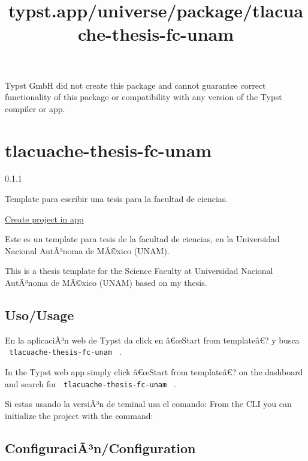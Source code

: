 Typst GmbH did not create this package and cannot guarantee correct
functionality of this package or compatibility with any version of the
Typst compiler or app.


\title{typst.app/universe/package/tlacuache-thesis-fc-unam}

\label{banner}
\label{template-thumbnail}

\section{tlacuache-thesis-fc-unam}\label{tlacuache-thesis-fc-unam}

{ 0.1.1 }

Template para escribir una tesis para la facultad de ciencias.

\href{/app?template=tlacuache-thesis-fc-unam&version=0.1.1}{Create
project in app}

\label{readme}
Este es un template para tesis de la facultad de ciencias, en la
Universidad Nacional AutÃ³noma de MÃ©xico (UNAM).

This is a thesis template for the Science Faculty at Universidad
Nacional AutÃ³noma de MÃ©xico (UNAM) based on my thesis.

\subsection{Uso/Usage}\label{usousage}

En la aplicaciÃ³n web de Typst da click en â€œStart from templateâ€? y
busca \texttt{\ tlacuache-thesis-fc-unam\ } .

In the Typst web app simply click â€œStart from templateâ€? on the
dashboard and search for \texttt{\ tlacuache-thesis-fc-unam\ } .

Si estas usando la versiÃ³n de teminal usa el comando: From the CLI you
can initialize the project with the command:

\begin{Shaded}
\begin{Highlighting}[]
\end{Highlighting}
\end{Shaded}

\subsection{ConfiguraciÃ³n/Configuration}\label{configuraciuxe3uxb3nconfiguration}


